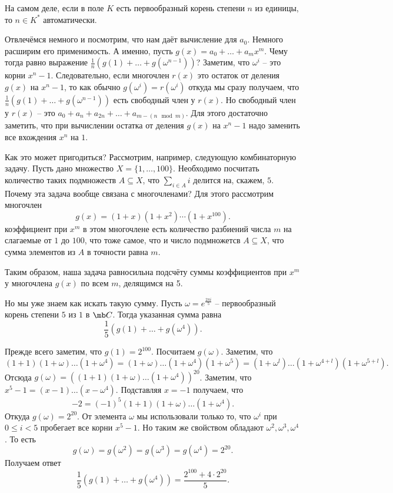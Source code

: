 \upr На самом деле, если в поле $K$ есть первообразный корень степени $n$ из единицы, то $n \in K^*$ автоматически.
\eupr

Отвлечёмся немного и посмотрим, что нам даёт вычисление для $a_0$. Немного расширим его применимость. А именно, пусть $g(x)=a_0+\dots+ a_m x^m$. Чему тогда равно выражение $\frac{1}{n}\left(g(1)+\dots+g(\omega^{n-1})\right)$? Заметим, что $\omega^i$ -- это корни $x^n-1$. Следовательно, если многочлен $r(x)$ это остаток от деления $g(x)$ на $x^n-1$, то как обычно $g(\omega^i)=r(\omega^i)$ откуда мы сразу  получаем, что $\frac{1}{n}\left(g(1)+\dots+g(\omega^{n-1})\right)$ есть свободный член у $r(x)$. Но свободный член у $r(x)$ -- это $a_0+a_n+a_{2n}+\dots + a_{m-(n\mod m)}$. Для этого достаточно заметить, что при вычислении остатка от деления $g(x)$ на $x^n-1$ надо заменить все вхождения $x^n$ на $1$.

Как это может пригодиться? Рассмотрим, например, следующую комбинаторную задачу. Пусть дано множество $X=\{1,\dots,100\}$. Необходимо посчитать количество таких подмножеств $A\subseteq X$, что $\sum_{i\in A} i$ делится на, скажем, $5$. Почему эта задача вообще связана с многочленами? Для этого рассмотрим многочлен $$g(x)=(1+x)(1+x^2)\cdots(1+x^{100}).$$
коэффициент при $x^m$ в этом многочлене есть количество разбиений числа $m$ на слагаемые от $1$ до $100$, что тоже самое, что и число подмножетсв $A \subseteq X$, что сумма элементов из $A$ в точности равна $m$. 

Таким образом, наша задача равносильна подсчёту суммы коэффициентов при $x^m$ у многочлена $g(x)$ по всем $m$, делящимся на 5.

Но мы уже знаем как искать такую сумму. Пусть $\omega=e^{\frac{2\pi i}{5}}$ -- первообразный корень степени $5$ из $1$ в $\mb C$. Тогда указанная сумма равна 
$$\frac{1}{5}\left(g(1)+\dots+g(\omega^4)\right).$$

Прежде всего заметим, что $g(1)=2^{100}$. Посчитаем $g(\omega)$. Заметим, что $$(1+1)(1+\omega)\dots(1+\omega^4)=(1+\omega)\dots(1+\omega^4)(1+\omega^5)=(1+\omega^l)\dots(1+\omega^{4+l})(1+\omega^{5+l}).$$
Отсюда $g(\omega)= ((1+1)(1+\omega)\dots(1+\omega^4))^{20}$. Заметим, что $x^5-1=(x-1)\dots(x-\omega^4)$. Подставляя $x=-1$ получаем, что 
$$-2=(-1)^5(1+1)(1+\omega)\dots(1+\omega^4).$$
Откуда $g(\omega)=2^{20}$. От элемента $\omega$ мы использовали только то, что $\omega^i$ при $0\leq i <5$ пробегает все корни $x^5-1$. Но таким же свойством обладают $\omega^2, \omega^3,\omega^4$. То есть $$g(\omega)=g(\omega^2)=g(\omega^3)=g(\omega^4)=2^{20}.$$
Получаем ответ 
$$\frac{1}{5}\left(g(1)+\dots+g(\omega^4)\right)=\frac{2^{100}+4\cdot 2^{20}}{5}.$$

